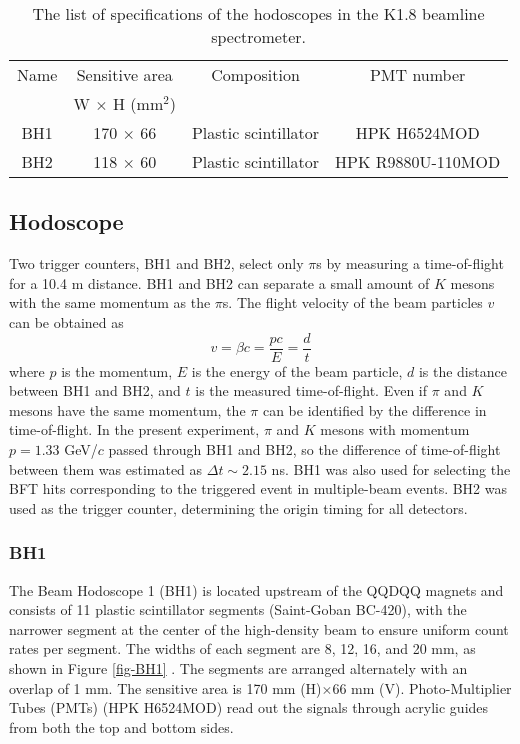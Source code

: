 
\begin{table}[h]
  \begin{center}
    \caption{The list of specifications of the hodoscopes in the K1.8 beamline spectrometer.}
    \begin{tabular}{cccc} 
      Name & Sensitive area & Composition & PMT number \\
       & W $\times$ H (mm$^2$) & & \\ \hline\hline
      BH1& 170 $\times$ 66 & Plastic scintillator & HPK H6524MOD \\
      BH2 & 118 $\times$ 60 & Plastic scintillator & HPK R9880U-110MOD  \\ 
   \end{tabular}
   \label{tab-K1.8spec-hodo}
   \end{center}
\end{table}

\subsection{Hodoscope}
Two trigger counters, BH1 and BH2, select only $\pi$s by measuring a time-of-flight for a 10.4 m distance. BH1 and BH2 can separate a small amount of $K$ mesons with the same momentum as the $\pi$s. The flight velocity of the beam particles $v$ can be obtained as
\begin{equation}
  v = \beta c = \frac{pc}{E} = \frac{d}{t}
  \label{eq:velo}
\end{equation}
where $p$ is the momentum, $E$ is the energy of the beam particle, $d$ is the distance between BH1 and BH2, and $t$ is the measured time-of-flight. Even if $\pi$ and $K$ mesons have the same momentum, the $\pi$ can be identified by the difference in time-of-flight. In the present experiment, $\pi$ and $K$ mesons with momentum $p = 1.33$ GeV/$c$ passed through BH1 and BH2, so the difference of time-of-flight between them was estimated as $\Delta t \sim 2.15$ ns. BH1 was also used for selecting the BFT hits corresponding to the triggered event in multiple-beam events. BH2 was used as the trigger counter, determining the origin timing for all detectors.

\subsubsection{BH1}
The Beam Hodoscope 1 (BH1) \cite{BH1} is located upstream of the QQDQQ magnets and consists of 11 plastic scintillator segments (Saint-Goban BC-420), with the narrower segment at the center of the high-density beam to ensure uniform count rates per segment. The widths of each segment are 8, 12, 16, and 20 mm, as shown in Figure \ref{fig-BH1} \cite{Honda-D}. The segments are arranged alternately with an overlap of 1 mm. The sensitive area is 170 mm (H)$\times$66 mm (V). Photo-Multiplier Tubes (PMTs) (HPK H6524MOD) read out the signals through acrylic guides from both the top and bottom sides.

